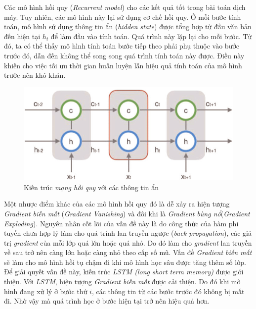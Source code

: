 Các mô hình hồi quy (\textit{Recurrent model}) cho các kết quả tốt trong bài toán dịch máy. Tuy nhiên, các mô hình này lại sử dụng cơ chế hồi quy. Ở mỗi bước tính toán, mô hình sử dụng thông tin ẩn (\textit{hidden state}) được tổng hợp từ đầu văn bản đến hiện tại $h_t$ để làm đầu vào tính toán. Quá trình này lặp lại cho mỗi bước. Từ đó, ta có thể thấy mô hình tính toán bước tiếp theo phải phụ thuộc vào bước trước đó, dẫn đến không thể song song quá trình tính toán này được. Điều này khiến cho việc tối ưu thời gian huấn luyện lẫn hiệu quả tính toán của mô hình trước nên khó khăn.

\begin{figure}[H]
    \begin{center}
        \includegraphics[scale=0.6]{images/hidden-state}
        \caption{Kiến trúc \textit{mạng hồi quy} với các thông tin ẩn}
        \label{fig:hidden state}
    \end{center}
\end{figure}

Một nhược điểm khác của các mô hình hồi quy đó là dễ xảy ra hiện tượng \textit{Gradient biến mất} (\textit{Gradient Vanishing}) và đôi khi là \textit{Gradient bùng nổ}(\textit{Gradient Exploding}). Nguyên nhân cốt lõi của vấn đề này là do công thức của hàm phi tuyến chưa hợp lý làm cho quá trình lan truyền ngược (\textit{back propagation}), các giá trị \textit{gradient} của mỗi lớp quá lớn hoặc quá nhỏ. Do đó làm cho \textit{gradient} lan truyền về sau trở nên càng lớn hoặc càng nhỏ theo cấp số mũ. Vấn đề \textit{Gradient biến mất} sẽ làm cho mô hình hồi tụ chậm đi khi mô hình học sâu được tăng thêm số lớp. Để giải quyết vấn đề này, kiến trúc \textit{LSTM (long short term memory)} được giới thiệu. Với \textit{LSTM}, hiện tượng \textit{Gradient biến mất} được cải thiện. Do đó khi mô hình đang xử lý ở bước thứ $i$, các thông tin từ các bước trước đó không bị mất đi. Nhờ vậy mà quá trình học ở bước hiện tại trở nên hiệu quả hơn.

